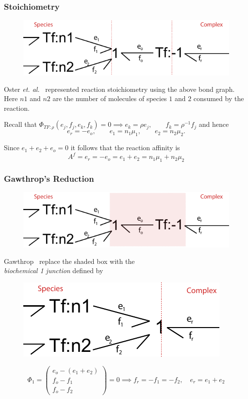\documentclass[10pt,reqno]{beamer}
\begin{document}
\begin{frame}
\frametitle{Stoichiometry}
\begin{figure}
\includegraphics{images/stoic_oster}
\end{figure}

Oster \emph{et. al.}~\cite{Oster:1973aa} represented reaction stoichiometry using the above bond graph.
\\
Here $n1$ and $n2$ are the number of molecules of species $1$ and $2$ consumed by the reaction. 
\vspace{10pt}

Recall that 
$\Phi_{TF:\rho}(e_j, f_j, e_k,f_k) = 0 \implies e_k =  \rho e_j,\qquad f_k = \rho^{-1}f_j$ and 
hence
\[
e_r = -e_o, \qquad e_1 = n_1\mu_1,\qquad e_2 = n_2\mu_2.
\]

Since $e_1 +e_2 +e_o  =0$ it follows that the reaction affinity is
\[
A^f =e_r = -e_o = e_1 + e_2 = n_1\mu_1 + n_2 \mu_2
\]
\end{frame}
\begin{frame}
\frametitle{Gawthrop's Reduction}
\begin{figure}
\includegraphics[scale=0.5]{images/stoic_oster_A}
\end{figure}
\begin{center}
Gawthrop~\cite{Gawthrop:2014aa} replace the shaded box with the\\ \emph{biochemical 1 junction} defined by 
\end{center}

\begin{figure}
	\includegraphics[scale=0.5]{images/stoic_gaw}
\end{figure}
\[
\Phi_{1} = \left(\begin{matrix}
e_o - (e_1 +e_2)\\
f_o -f_1\\
f_o -f_2  
\end{matrix}\right) = 0\implies f_r = -f_1 = -f_2, \quad e_r= e_1 + e_2
\]
\end{frame}
\end{document}
